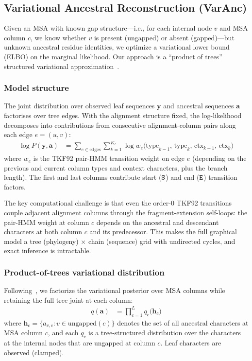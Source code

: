 \subsection{Variational Ancestral Reconstruction (VarAnc)}
\label{sec:varanc}

Given an MSA with known gap structure---i.e., for each internal node
$v$ and MSA column $c$, we know whether $v$ is present (ungapped) or
absent (gapped)---but unknown ancestral residue identities, we
optimize a variational lower bound (ELBO) on the marginal likelihood.
Our approach is a ``product of trees'' structured variational
approximation~\cite{JojicEtAl2004}.

\subsubsection{Model structure}

The joint distribution over observed leaf sequences $\mathbf{y}$
and ancestral sequences $\mathbf{a}$ factorises over tree edges.
With the alignment structure fixed, the log-likelihood decomposes into
contributions from consecutive alignment-column pairs along each edge $e = (u,v)$:
\begin{align}
\log P(\mathbf{y}, \mathbf{a})
 &= \sum_{e \in \mathrm{edges}} \sum_{k=1}^{K_e}
    \log w_e\!\bigl(\mathrm{type}_{k-1},\, \mathrm{type}_k,\, \mathrm{ctx}_{k-1},\, \mathrm{ctx}_k\bigr)
\label{eq:lik-edges-tkf}
\end{align}
where $w_e$ is the TKF92 pair-HMM transition weight on edge $e$
(depending on the previous and current column types and context characters,
plus the branch length).
The first and last columns contribute start (${\tt S}$) and end (${\tt E}$) transition factors.

The key computational challenge is that even the order-0 TKF92 transitions
couple adjacent alignment columns through the fragment-extension
self-loops: the pair-HMM weight at column $c$ depends on the
ancestral and descendant characters at both column $c$ and its predecessor.
This makes the full graphical model a tree (phylogeny) $\times$ chain (sequence)
grid with undirected cycles, and exact inference is intractable.

\subsubsection{Product-of-trees variational distribution}

Following~\cite{JojicEtAl2004}, we factorize the variational posterior
over MSA columns while retaining the full tree joint at each column:
\begin{align}
q(\mathbf{a}) &= \prod_{c=1}^{L} q_c\!\bigl(\mathbf{h}_c\bigr)
\label{eq:var-q-pot-tkf}
\end{align}
where $\mathbf{h}_c = \{a_{v,c} : v \in \mathrm{ungapped}(c)\}$ denotes the set of
all ancestral characters at MSA column $c$,
and each $q_c$ is a tree-structured distribution over the characters at the
internal nodes that are ungapped at column $c$.
Leaf characters are observed (clamped).

